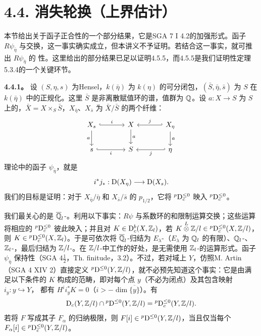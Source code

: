 \section*{4.4. 消失轮换（上界估计）}
本节给出关于函子正合性的一个部分结果，它是SGA 7 I 4.2的加强形式。函子 $R\psi_{\bar\eta}$ 与交换，这一事实确实成立，但本讲义不予证明。若结合这一事实，就可推出 $R\psi_{\bar\eta}$ 的 性。这里给出的部分结果已足以证明4.5.5，而4.5.5是我们证明性定理5.3.4的一个关键环节。

\par\medskip\noindent\textbf{4.4.1。} 设 $(S,\eta,s)$ 为Hensel，$k(\bar\eta)$ 为 $k(\eta)$ 的可分闭包，$(\bar S,\bar\eta,\bar s)$ 为 $S$ 在 $k(\bar\eta)$ 中的正规化。这里 $\bar S$ 是非离散赋值环的谱，值群为 $\mathbb Q$。设 $a:X\to S$ 为 $S$ 上的，$\bar X=X\times_S\bar S$，$X_{\bar\eta}$、$X_{\bar s}$ 为 $\bar X/\bar S$ 的两个纤维：
\[
\begin{tikzcd}[ampersand replacement=\&,column sep=large]
X_{\bar s}\arrow[r,hook,"{i}"]\arrow[d,"{a}"']\&\bar X\arrow[d,"{a}"]\&X_{\bar\eta}\arrow[l,hook',"{j}"']\arrow[d,"{a}"]\\
\bar s\arrow[r,hook,"{i}"']\&\bar S\&\bar\eta\arrow[l,hook',"{j}"]
\end{tikzcd}
\]
理论中的函子 $\psi_{\bar\eta}$，就是
\[i^*j_*:\mathrm{D}(X_{\relax\eta})\longrightarrow\mathrm{D}(X_{\relax s}).\]
我们的目标是证明：对于 $X_{\bar\eta}/\bar\eta$ 和 $X_{\bar s}/\bar s$ 的 $p_{1/2}$，它将 ${}^p\mathrm{D}_c^{\le0}$ 映入 ${}^p\mathrm{D}_c^{\le0}$。

我们最关心的是 $\overline{\mathbb Q}_l$-。利用以下事实：$R\psi$ 与系数环的和限制运算交换；这些运算将相应的 ${}^p\mathrm{D}_c^{\le0}$ 彼此映入；并且对 $K\in\mathrm{D}_c^b(X,\mathbb Z_l)$，若 $K\overset L\otimes\mathbb Z/l\in{}^p\mathrm{D}_c^{\le0}(X,\mathbb Z/l)$，则 $K\in{}^p\mathrm{D}_c^{\le0}(X,\mathbb Z_l)$。于是可依次将 $\overline{\mathbb Q}_l$-归结为 $E_\lambda$-（$E_\lambda$ 为 $\mathbb Q_l$ 的有限）、$\mathbb Q_l$-、$\mathbb Z_l$-，最后归结为 $\mathbb Z/l$-。在 $\mathbb Z/l$-中工作的好处，是无需使用 $\mathbb Z_l$-的运算形式。函子 $\psi_{\bar\eta}$ 保持性（SGA $4\frac12$，Th. finitude，3.2）。不过，若对域上 $Y$，仿照M. Artin（SGA 4 XIV 2）直接定义 ${}^p\mathrm{D}^{\le0}(Y,\mathbb Z/l)$，就不必预先知道这个事实：它是由满足以下条件的 $K$ 构成的范畴，即对每个点 $y$（不必为闭点）及其包含映射 $i_y:y\hookrightarrow Y$，
都有 $H^ii_y^*K=0$（$i>-\dim\overline{\{y\}}$）。有
\[\mathrm{D}_c(Y,\mathbb Z/l)\cap{}^p\mathrm{D}^{\le0}(Y,\mathbb Z/l)={}^p\mathrm{D}_c^{\le0}(Y,\mathbb Z/l).\]
若将 $F$ 写成其子 $F_\alpha$ 的归纳极限，则 $F[i]\in{}^p\mathrm{D}^{\le0}(Y,\mathbb Z/l)$，当且仅当每个 $F_\alpha[i]\in{}^p\mathrm{D}_c^{\le0}(Y,\mathbb Z/l)$。

